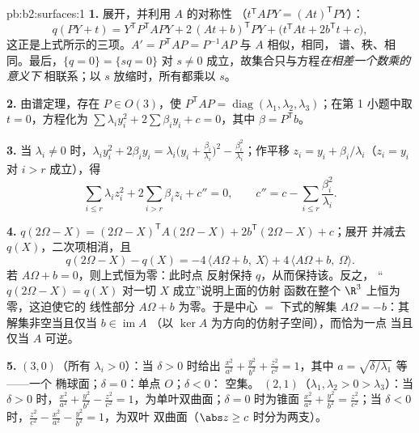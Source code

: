 \begin{solution}{pb:b2:surfaces:1}
\textbf{1.} 展开，并利用 $A$ 的对称性
（$t^{\mathsf T}\!APY = (At)^{\mathsf T}PY$）：
\[
q(PY + t) = Y^{\mathsf T}P^{\mathsf T}\!APY +
2\,(At + b)^{\mathsf T}PY + \bigl(t^{\mathsf T}\!At +
2b^{\mathsf T}t + c\bigr),
\]
这正是上式所示的三项。$A' = P^{\mathsf T}\!AP =
P^{-1}AP$ 与 $A$ 相似，相同，
谱、秩、相同。最后，$\{q = 0\} = \{sq = 0\}$
对 $s \neq 0$ 成立，故集合只与方程\emph{在相差一个数乘的意义下}
相联系；以 $s$ 放缩时，所有都乘以
$s$。

\textbf{2.} 由谱定理，存在 $P \in O(3)$，使
$P^{\mathsf T}\!AP = \operatorname{diag}(\lambda_1, \lambda_2,
\lambda_3)$；在第 1 小题中取 $t = 0$，方程化为
$\sum\lambda_iy_i^2 + 2\sum\beta_iy_i + c = 0$，其中 $\beta =
P^{\mathsf T}b$。

\textbf{3.} 当 $\lambda_i \neq 0$ 时，$\lambda_iy_i^2 +
2\beta_iy_i = \lambda_i\bigl(y_i +
\frac{\beta_i}{\lambda_i}\bigr)^2 -
\frac{\beta_i^2}{\lambda_i}$；作平移 $z_i = y_i +
\beta_i/\lambda_i$（$z_i = y_i$ 对 $i > r$ 成立），得
\[
\sum_{i \leq r}\lambda_iz_i^2 + 2\sum_{i > r}\beta_iz_i +
c'' = 0, \qquad
c'' = c - \sum_{i\leq r}\frac{\beta_i^2}{\lambda_i}.
\]

\textbf{4.} $q(2\Omega - X) = (2\Omega - X)^{\mathsf T}
A(2\Omega - X) + 2b^{\mathsf T}(2\Omega - X) + c$；展开
并减去 $q(X)$，二次项相消，且
\[
q(2\Omega - X) - q(X) = -4\,\langle A\Omega + b,\ X\rangle +
4\,\langle A\Omega + b,\ \Omega\rangle .
\]
若 $A\Omega + b = 0$，则上式恒为零：此时点
反射保持 $q$，从而保持该。反之，
“$q(2\Omega - X) = q(X)$ 对一切 $X$ 成立”说明上面的仿射
函数在整个 $\R^3$ 上恒为零，这迫使它的
线性部分 $A\Omega + b$ 为零。于是中心 $=$ 下式的解集
$A\Omega = -b$：其解集非空当且仅当 $b \in \operatorname{im}A$
（以 $\ker A$ 为方向的仿射子空间），而恰为一点
当且仅当 $A$ 可逆。

\textbf{5.}  $(3,0)$（所有 $\lambda_i > 0$）：当 $\delta >
0$ 时给出 $\frac{x^2}{a^2} + \frac{y^2}{b^2} + \frac{z^2}{c^2}
= 1$，其中 $a = \sqrt{\delta/\lambda_1}$ 等——一个
椭球面；$\delta = 0$：单点 $O$；$\delta < 0$：
空集。 $(2,1)$（$\lambda_1, \lambda_2 > 0 >
\lambda_3$）：当 $\delta > 0$ 时，$\frac{x^2}{a^2} + \frac{y^2}{b^2}
- \frac{z^2}{c^2} = 1$，为单叶双曲面；$\delta =
0$ 时为锥面 $\frac{x^2}{a^2} + \frac{y^2}{b^2} =
\frac{z^2}{c^2}$；当 $\delta < 0$ 时，$\frac{z^2}{c^2} -
\frac{x^2}{a^2} - \frac{y^2}{b^2} = 1$，为双叶
双曲面（$\abs z \geq c$ 时分为两支）。


\end{solution}
